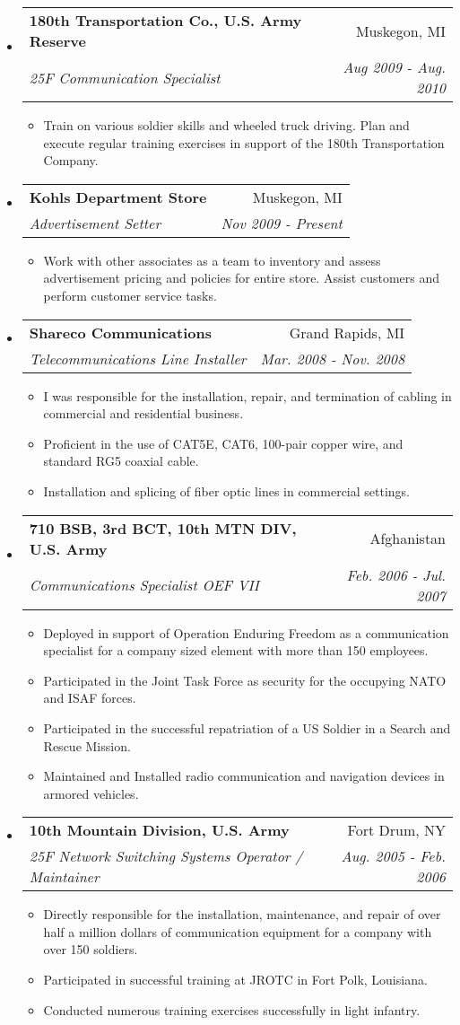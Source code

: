 \documentclass[letterpaper,11pt]{article}
\makeatletter
\newcommand{\resitem}[1]{\item #1 \vspace{-2pt}}
\newcommand{\resheading}[1]{{\large \parashade[.9]{sharpcorners}{\textbf{#1 \vphantom{p\^{E}}}}}}
\newcommand{\ressubheading}[4]{
\begin{tabular*}{6.5in}{l@{\extracolsep{\fill}}r}
		\textbf{#1} & #2 \\
		\textit{#3} & \textit{#4} \\
\end{tabular*}\vspace{-6pt}}
\makeatother
\begin{document}
\resheading{Work Experience}
\begin{itemize}
\item
	\ressubheading{180th Transportation Co., U.S. Army Reserve}{Muskegon, MI}{25F Communication Specialist}{Aug 2009 - Aug. 2010}
	\begin{itemize}
		\resitem{Train on various soldier skills and wheeled truck driving. Plan and execute regular training exercises in support of the 180th Transportation Company.}
	\end{itemize}

\item 
	\ressubheading{Kohls Department Store}{Muskegon, MI}{Advertisement Setter}{Nov 2009 - Present}
	\begin{itemize}
		\resitem{Work with other associates as a team to inventory and assess advertisement pricing and policies for entire store. Assist customers and perform customer service tasks.}
	\end{itemize}

\item
	\ressubheading{Shareco Communications}{Grand Rapids, MI}{Telecommunications Line Installer}{Mar. 2008 - Nov. 2008}
	\begin{itemize}
		\resitem{I was responsible for the installation, repair, and termination of cabling in commercial and residential business.}
		\resitem{Proficient in the use of  CAT5E, CAT6, 100-pair copper wire, and standard RG5 coaxial cable.}
		\resitem{Installation and splicing of fiber optic lines in commercial settings.}
	\end{itemize}

\item
	\ressubheading{710 BSB, 3rd BCT, 10th MTN DIV, U.S. Army}{Afghanistan}{Communications Specialist OEF VII}{Feb. 2006 - Jul. 2007}
	\begin{itemize}
		\resitem{Deployed in support of Operation Enduring Freedom as a communication specialist for a company sized element with more than 150 employees. }
		\resitem{Participated in the Joint Task Force as security for the occupying NATO and ISAF forces.}
		\resitem{Participated in the successful repatriation of a US Soldier in a Search and Rescue Mission.}
		\resitem{Maintained and Installed radio communication and navigation devices in armored vehicles.}
	\end{itemize}

\item
	\ressubheading{10th Mountain Division, U.S. Army}{Fort Drum, NY}{25F Network Switching Systems Operator / Maintainer }{Aug. 2005 - Feb. 2006}
	\begin{itemize}
		\resitem{Directly responsible for the installation, maintenance, and repair of over half a million dollars of communication equipment for a company with over 150 soldiers.}
		\resitem{Participated in successful training at JROTC in Fort Polk, Louisiana.}
		\resitem{Conducted numerous training exercises successfully in light infantry.}
	\end{itemize}
\end{itemize}
\end{document}
